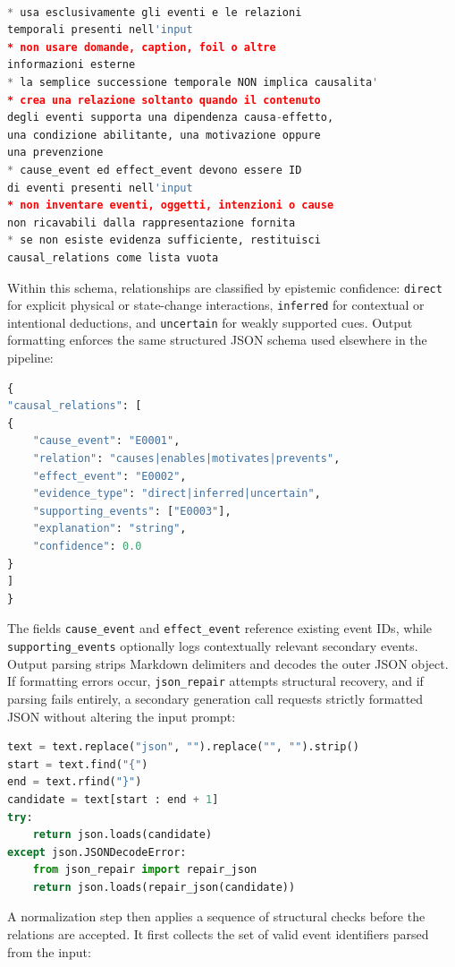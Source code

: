 \begin{lstlisting}[language=Python]

* usa esclusivamente gli eventi e le relazioni
temporali presenti nell'input
* non usare domande, caption, foil o altre
informazioni esterne
* la semplice successione temporale NON implica causalita'
* crea una relazione soltanto quando il contenuto
degli eventi supporta una dipendenza causa-effetto,
una condizione abilitante, una motivazione oppure
una prevenzione
* cause_event ed effect_event devono essere ID
di eventi presenti nell'input
* non inventare eventi, oggetti, intenzioni o cause
non ricavabili dalla rappresentazione fornita
* se non esiste evidenza sufficiente, restituisci
causal_relations come lista vuota
\end{lstlisting}
Within this schema, relationships are classified by epistemic confidence: \texttt{direct} for explicit physical or state-change interactions, \texttt{inferred} for contextual or intentional deductions, and \texttt{uncertain} for weakly supported cues. Output formatting enforces the same structured JSON schema used elsewhere in the pipeline:
\begin{lstlisting}[language=Python]
{
"causal_relations": [
{
    "cause_event": "E0001",
    "relation": "causes|enables|motivates|prevents",
    "effect_event": "E0002",
    "evidence_type": "direct|inferred|uncertain",
    "supporting_events": ["E0003"],
    "explanation": "string",
    "confidence": 0.0
}
]
}
\end{lstlisting}
The fields \texttt{cause\_event} and \texttt{effect\_event} reference existing event IDs, while \texttt{supporting\_events} optionally logs contextually relevant secondary events.
Output parsing strips Markdown delimiters and decodes the outer JSON object. If formatting errors occur, \texttt{json\_repair} attempts structural recovery, and if parsing fails entirely, a secondary generation call requests strictly formatted JSON without altering the input prompt:
\begin{lstlisting}[language=Python]
text = text.replace("json", "").replace("", "").strip()
start = text.find("{")
end = text.rfind("}")
candidate = text[start : end + 1]
try:
    return json.loads(candidate)
except json.JSONDecodeError:
    from json_repair import repair_json
    return json.loads(repair_json(candidate))
\end{lstlisting}
A normalization step then applies a sequence of structural checks before the relations are accepted. It first collects the set of valid event identifiers parsed from the input:
